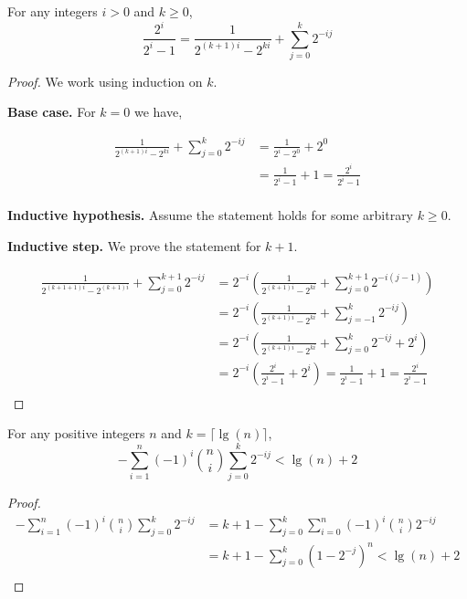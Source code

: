 \begin{lemma}
  For any integers $i > 0$ and $k \ge 0$,
  \[
    \frac{2^i}{2^i-1} = \frac{1}{2^{(k+1)i}-2^{ki}} + \sum_{j=0}^k 2^{-ij}
  \]
\end{lemma}
\begin{proof}
  We work using induction on $k$.

  \noindent
  \textbf{Base case.}
  For $k=0$ we have,

  \begin{align*}
    \frac{1}{2^{(k+1)i}-2^{ki}} + \sum_{j=0}^k 2^{-ij}
    &= \frac{1}{2^i-2^0} + 2^0 \\
    &= \frac{1}{2^i-1} + 1 = \frac{2^i}{2^i-1} \\
  \end{align*}

  \noindent
  \textbf{Inductive hypothesis.}
  Assume the statement holds for some arbitrary $k \ge 0$.

  \noindent
  \textbf{Inductive step.}
  We prove the statement for $k+1$.

  \begin{align*}
    \frac{1}{2^{(k+1+1)i}-2^{(k+1)i}} + \sum_{j=0}^{k+1} 2^{-ij}
    &= 2^{-i} (\frac{1}{2^{(k+1)i}-2^{ki}} + \sum_{j=0}^{k+1} 2^{-i(j-1)}) \\
    &= 2^{-i} (\frac{1}{2^{(k+1)i}-2^{ki}} + \sum_{j=-1}^{k} 2^{-ij}) \\
    &= 2^{-i} (\frac{1}{2^{(k+1)i}-2^{ki}} + \sum_{j=0}^{k} 2^{-ij} + 2^i) \\
    &= 2^{-i} (\frac{2^i}{2^i-1} + 2^i) = \frac{1}{2^i-1} + 1 = \frac{2^i}{2^i-1} \\
  \end{align*}
\end{proof}

\begin{lemma}
  For any positive integers $n$ and $k=\lceil \lg(n) \rceil$,
  \[
    -\sum_{i=1}^n (-1)^i {n \choose i} \sum_{j=0}^k 2^{-ij} < \lg(n) + 2
  \]
\end{lemma}
\begin{proof}
  \begin{align*}
    -\sum_{i=1}^n (-1)^i {n \choose i} \sum_{j=0}^k 2^{-ij}
    &= k+1 - \sum_{j=0}^k \sum_{i=0}^n (-1)^i {n \choose i} 2^{-ij} \\
    &= k+1 - \sum_{j=0}^k (1-2^{-j})^n < \lg(n) + 2 \\
  \end{align*}
\end{proof}

